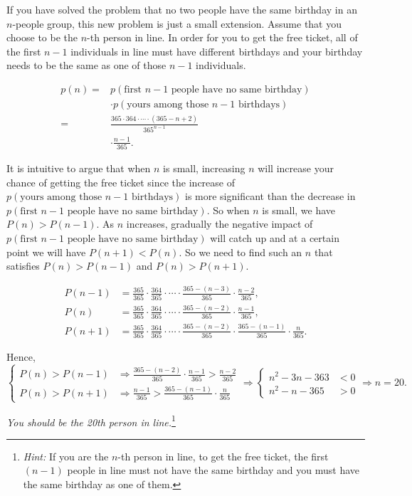 \begin{solution}
If you have solved the problem that no two people have the same birthday in an $n$-people group, this new problem is just a small extension. Assume that you choose to be the $n$-th person in line. In order for you to get the free ticket, all of the first $n-1$ individuals in line must have different birthdays and your birthday needs to be the same as one of those $n-1$ individuals.

\[
\begin{aligned}
p(n)={}&p(\text{first $n-1$ people have no same birthday})\\
&\cdot p(\text{yours among those $n-1$ birthdays})\\
={}&\frac{365\cdot364\cdot\cdots\cdot(365-n+2)}{365^{n-1}}\\
&\cdot\frac{n-1}{365}.
\end{aligned}
\]

It is intuitive to argue that when $n$ is small, increasing $n$ will increase your chance of getting the free ticket since the increase of $p(\text{yours among those $n-1$ birthdays})$ is more significant than the decrease in $p(\text{first $n-1$ people have no same birthday})$. So when $n$ is small, we have $P(n)>P(n-1)$. As $n$ increases, gradually the negative impact of $p(\text{first $n-1$ people have no same birthday})$ will catch up and at a certain point we will have $P(n+1)<P(n)$. So we need to find such an $n$ that satisfies $P(n)>P(n-1)$ and $P(n)>P(n+1)$.

\[
\begin{aligned}
P(n-1)&=\frac{365}{365}\cdot\frac{364}{365}\cdot\cdots\cdot\frac{365-(n-3)}{365}\cdot\frac{n-2}{365},\\
P(n)&=\frac{365}{365}\cdot\frac{364}{365}\cdot\cdots\cdot\frac{365-(n-2)}{365}\cdot\frac{n-1}{365},\\
P(n+1)&=\frac{365}{365}\cdot\frac{364}{365}\cdot\cdots\cdot\frac{365-(n-2)}{365}\cdot\frac{365-(n-1)}{365}\cdot\frac{n}{365}.
\end{aligned}
\]

Hence,
\[
\left\{
\begin{aligned}
P(n)>P(n-1)&\Rightarrow \frac{365-(n-2)}{365}\cdot\frac{n-1}{365}>\frac{n-2}{365}\\
P(n)>P(n+1)&\Rightarrow \frac{n-1}{365}>\frac{365-(n-1)}{365}\cdot\frac{n}{365}
\end{aligned}
\right.
\Rightarrow
\left\{
\begin{aligned}
n^2-3n-363&<0\\
n^2-n-365&>0
\end{aligned}
\right.
\Rightarrow n=20.
\]

\emph{You should be the 20th person in line.}\footnote[14]{\emph{Hint:} If you are the $n$-th person in line, to get the free ticket, the first $(n-1)$ people in line must not have the same birthday and you must have the same birthday as one of them.}

\end{solution}


